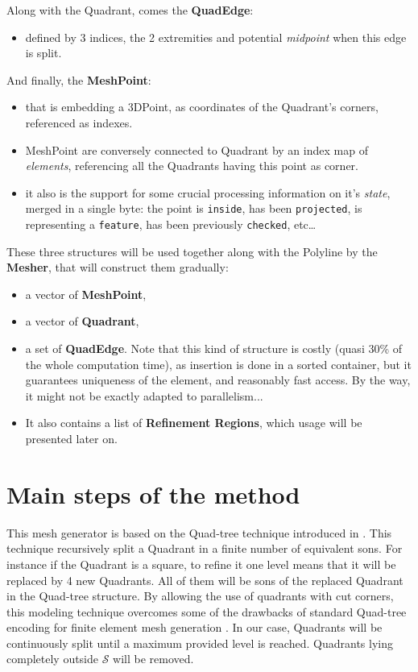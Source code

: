 \documentclass[10pt]{article}
\begin{document}
Along with the Quadrant, comes the \textbf{QuadEdge}:
\begin{itemize}
\item defined by 3 indices, the 2 extremities and potential \textit{midpoint} when this edge is split.
\end{itemize}

And finally, the \textbf{MeshPoint}:
\begin{itemize}
\item that is embedding a 3DPoint, as coordinates of the Quadrant's corners, referenced as indexes.
\item MeshPoint are conversely connected to Quadrant by an index map of \textit{elements}, referencing all the Quadrants having this point as corner.
\item it also is the support for some crucial processing information on it's \textit{state}, merged in a single byte: the point is \verb?inside?, has been \verb?projected?, is representing a \verb?feature?, has been previously \verb?checked?, etc\ldots  
\end{itemize}

These three structures will be used together along with the Polyline by the \textbf{Mesher}, that will construct them gradually:
\begin{itemize}
\item a vector of \textbf{MeshPoint},
\item a vector of \textbf{Quadrant},
\item a set of \textbf{QuadEdge}. Note that this kind of structure is costly (quasi 30\% of the whole computation time), as insertion is done in a sorted container, but it guarantees uniqueness of the element, and reasonably fast access. By the way, it might not be exactly adapted to parallelism...
\item It also contains a list of \textbf{Refinement Regions}, which usage will be presented later on.
\end{itemize}

\section{Main steps of the method}
\label{sec:method}
This mesh generator is based on the Quad-tree technique introduced in \cite{Finkel1974}. This technique recursively split a Quadrant in a finite number of equivalent sons. For instance if the Quadrant is a square, to refine it one level means that it will be replaced by 4 new Quadrants. All of them will be sons of the replaced Quadrant in the Quad-tree structure. By allowing the use of quadrants with cut corners, this modeling technique overcomes some of the drawbacks of standard Quad-tree encoding for finite element mesh generation \cite{Yerry1983}.
In our case, Quadrants will be continuously split until a maximum provided level is reached. Quadrants lying completely outside $\mathcal{S}$ will be removed.\\
\end{document}
